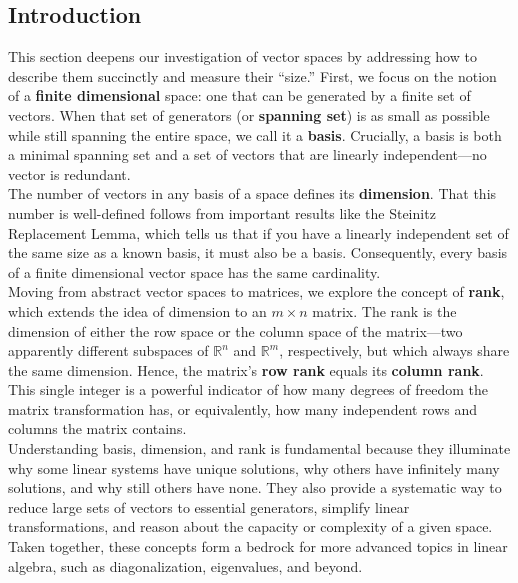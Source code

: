 \documentclass[a4paper, 9pt]{extarticle}
\begin{document}
\subsection*{Introduction}
This section deepens our investigation of vector spaces by addressing how to describe them succinctly and measure their “size.” First, we focus on the notion of a \textbf{finite dimensional} space: one that can be generated by a finite set of vectors. When that set of generators (or \textbf{spanning set}) is as small as possible while still spanning the entire space, we call it a \textbf{basis}. Crucially, a basis is both a minimal spanning set and a set of vectors that are linearly independent—no vector is redundant. \\[2ex]
\noindent The number of vectors in any basis of a space defines its \textbf{dimension}. That this number is well-defined follows from important results like the Steinitz Replacement Lemma, which tells us that if you have a linearly independent set of the same size as a known basis, it must also be a basis. Consequently, every basis of a finite dimensional vector space has the same cardinality. \\[2ex]
\noindent Moving from abstract vector spaces to matrices, we explore the concept of \textbf{rank}, which extends the idea of dimension to an $m\times n$ matrix. The rank is the dimension of either the row space or the column space of the matrix—two apparently different subspaces of $\mathbb{R}^n$ and $\mathbb{R}^m$, respectively, but which always share the same dimension. Hence, the matrix’s \textbf{row rank} equals its \textbf{column rank}. This single integer is a powerful indicator of how many degrees of freedom the matrix transformation has, or equivalently, how many independent rows and columns the matrix contains. \\[2ex]
\noindent Understanding basis, dimension, and rank is fundamental because they illuminate why some linear systems have unique solutions, why others have infinitely many solutions, and why still others have none. They also provide a systematic way to reduce large sets of vectors to essential generators, simplify linear transformations, and reason about the capacity or complexity of a given space. Taken together, these concepts form a bedrock for more advanced topics in linear algebra, such as diagonalization, eigenvalues, and beyond.\\[2ex]
\end{document}
